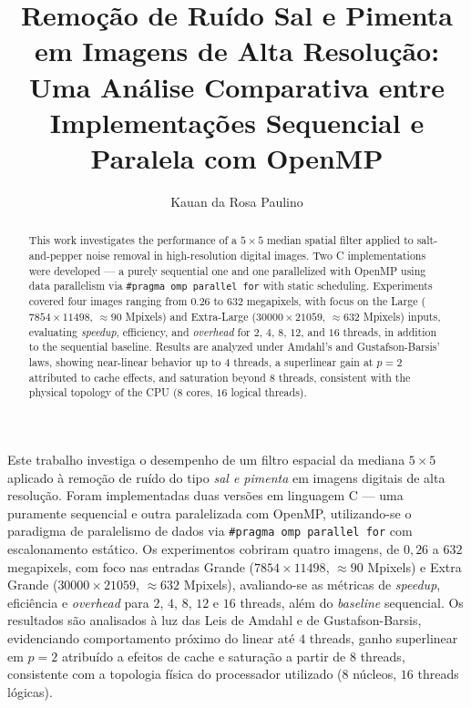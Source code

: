 \documentclass[12pt]{article}
\title{Remoção de Ruído Sal e Pimenta em Imagens de Alta Resolução: \\ Uma Análise Comparativa entre Implementações Sequencial e Paralela com OpenMP}
\author{Kauan da Rosa Paulino\inst{1}}
\begin{document}
\maketitle

\begin{resumo}
	Este trabalho investiga o desempenho de um filtro espacial da mediana $5 \times 5$ aplicado à remoção de ruído do tipo \textit{sal e pimenta} em imagens digitais de alta resolução. Foram implementadas duas versões em linguagem C --- uma puramente sequencial e outra paralelizada com OpenMP, utilizando-se o paradigma de paralelismo de dados via \texttt{\#pragma omp parallel for} com escalonamento estático. Os experimentos cobriram quatro imagens, de $0{,}26$ a $632$ megapixels, com foco nas entradas Grande ($7854 \times 11498$, $\approx 90$ Mpixels) e Extra Grande ($30000 \times 21059$, $\approx 632$ Mpixels), avaliando-se as métricas de \textit{speedup}, eficiência e \textit{overhead} para $2$, $4$, $8$, $12$ e $16$ threads, além do \textit{baseline} sequencial. Os resultados são analisados à luz das Leis de Amdahl e de Gustafson-Barsis, evidenciando comportamento próximo do linear até $4$ threads, ganho superlinear em $p=2$ atribuído a efeitos de cache e saturação a partir de $8$ threads, consistente com a topologia física do processador utilizado ($8$ núcleos, $16$ threads lógicas).
\end{resumo}

\begin{abstract}
	This work investigates the performance of a $5 \times 5$ median spatial filter applied to salt-and-pepper noise removal in high-resolution digital images. Two C implementations were developed --- a purely sequential one and one parallelized with OpenMP using data parallelism via \texttt{\#pragma omp parallel for} with static scheduling. Experiments covered four images ranging from $0.26$ to $632$ megapixels, with focus on the Large ($7854 \times 11498$, $\approx 90$ Mpixels) and Extra-Large ($30000 \times 21059$, $\approx 632$ Mpixels) inputs, evaluating \textit{speedup}, efficiency, and \textit{overhead} for $2$, $4$, $8$, $12$, and $16$ threads, in addition to the sequential baseline. Results are analyzed under Amdahl's and Gustafson-Barsis' laws, showing near-linear behavior up to $4$ threads, a superlinear gain at $p=2$ attributed to cache effects, and saturation beyond $8$ threads, consistent with the physical topology of the CPU ($8$ cores, $16$ logical threads).
\end{abstract}
\end{document}
